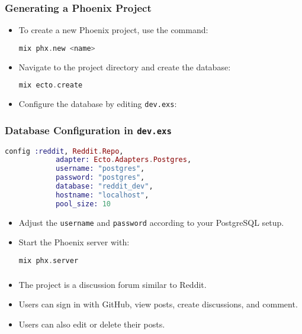 \documentclass[aspectratio=169, table]{beamer}
\begin{document}
	\begin{frame}[fragile]
		\frametitle{Generating a Phoenix Project}
		\begin{itemize}
			\item To create a new Phoenix project, use the command:
			\begin{lstlisting}[language=Elixir]
				mix phx.new <name>
			\end{lstlisting}
			\item Navigate to the project directory and create the database:
			\begin{lstlisting}[language=Elixir]
				mix ecto.create
			\end{lstlisting}
			\item Configure the database by editing \texttt{dev.exs}:
		\end{itemize}
	\end{frame}
	
	\begin{frame}[fragile]
		\frametitle{Database Configuration in \texttt{dev.exs}}
		\begin{lstlisting}[language=Elixir]
			config :reddit, Reddit.Repo,
			adapter: Ecto.Adapters.Postgres,
			username: "postgres",
			password: "postgres",
			database: "reddit_dev",
			hostname: "localhost",
			pool_size: 10
		\end{lstlisting}
		\begin{itemize}
			\item Adjust the \texttt{username} and \texttt{password} according to your PostgreSQL setup.
			\item Start the Phoenix server with:
			\begin{lstlisting}[language=Elixir]
				mix phx.server
			\end{lstlisting}
		\end{itemize}
	\end{frame}
	
	\begin{frame}
		\frametitle{}
		\begin{itemize}
			\item The project is a discussion forum similar to Reddit.
			\item Users can sign in with GitHub, view posts, create discussions, and comment.
			\item Users can also edit or delete their posts.
		\end{itemize}
	\end{frame}
	
\end{document}
